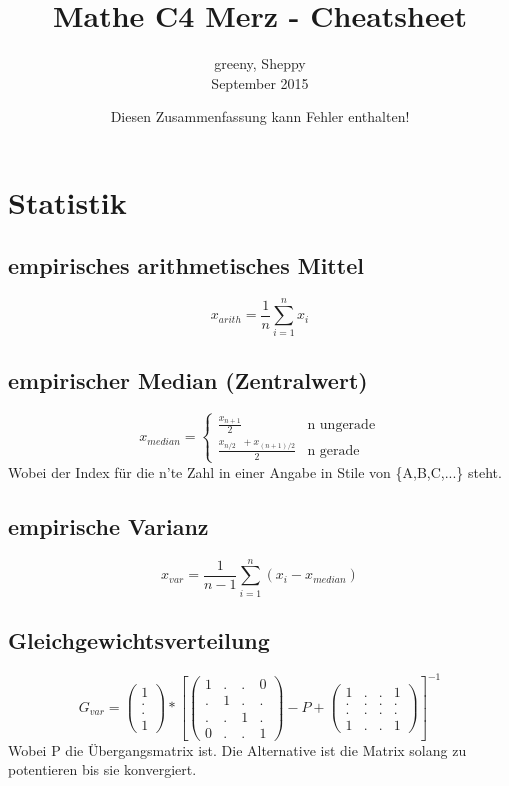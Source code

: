 \documentclass{article}
\title{Mathe C4 Merz - Cheatsheet}
\author{greeny, Sheppy\\September 2015}
\date{Diesen Zusammenfassung kann Fehler enthalten!}
\begin{document}
	\maketitle
	\section{Statistik}
	\subsection{empirisches arithmetisches Mittel}
	\[x_{arith}=\frac{1}{n}\sum_{i=1}^n x_i\]
	\subsection{empirischer Median (Zentralwert)}
	\[
	x_{median}=
	\begin{cases}
	\frac{x_{n+1}}{2}								& \text{n ungerade} \\
	\frac{x_{n/2} \;\; + x_{(n+1)/2}}{2}	& \text{n gerade}
	\end{cases}
	\]
	Wobei der Index für die n'te Zahl in einer Angabe in Stile von \{A,B,C,...\} steht.
	\subsection{empirische Varianz}
	\[x_{var}=\frac{1}{n-1}\sum_{i=1}^n (x_i-x_{median})\]
	\subsection{Gleichgewichtsverteilung}
	\[
	G_{var} = 
	\begin{pmatrix}
	1 \\
	. \\
	. \\
	1
	\end{pmatrix}
	*\left [
	\begin{pmatrix}
	1&.&.& 0 \\
	. & 1 &.& . \\
	. & . &1& . \\
	0&.&.&1
	
	\end{pmatrix}-P+
	\begin{pmatrix}
	1&.&.&1 \\
	.&.&.&. \\
	.&.&.&. \\
	1&.&.&1
	\end{pmatrix}\right ]
	^{-1}
	\]
	Wobei P die Übergangsmatrix ist. Die Alternative ist die Matrix solang zu potentieren bis sie konvergiert.
	
\end{document}
